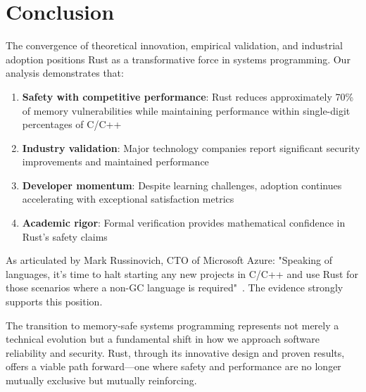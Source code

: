 \documentclass[11pt]{article}
\begin{document}
\section{Conclusion}

The convergence of theoretical innovation, empirical validation, and industrial adoption positions Rust as a transformative force in systems programming. Our analysis demonstrates that:

\begin{enumerate}
    \item \textbf{Safety with competitive performance}: Rust reduces approximately 70\% of memory vulnerabilities while maintaining performance within single-digit percentages of C/C++
    \item \textbf{Industry validation}: Major technology companies report significant security improvements and maintained performance
    \item \textbf{Developer momentum}: Despite learning challenges, adoption continues accelerating with exceptional satisfaction metrics
    \item \textbf{Academic rigor}: Formal verification provides mathematical confidence in Rust's safety claims
\end{enumerate}

As articulated by Mark Russinovich, CTO of Microsoft Azure: "Speaking of languages, it's time to halt starting any new projects in C/C++ and use Rust for those scenarios where a non-GC language is required"~\cite{russinovich2022}. The evidence strongly supports this position.

The transition to memory-safe systems programming represents not merely a technical evolution but a fundamental shift in how we approach software reliability and security. Rust, through its innovative design and proven results, offers a viable path forward—one where safety and performance are no longer mutually exclusive but mutually reinforcing.
\end{document}
